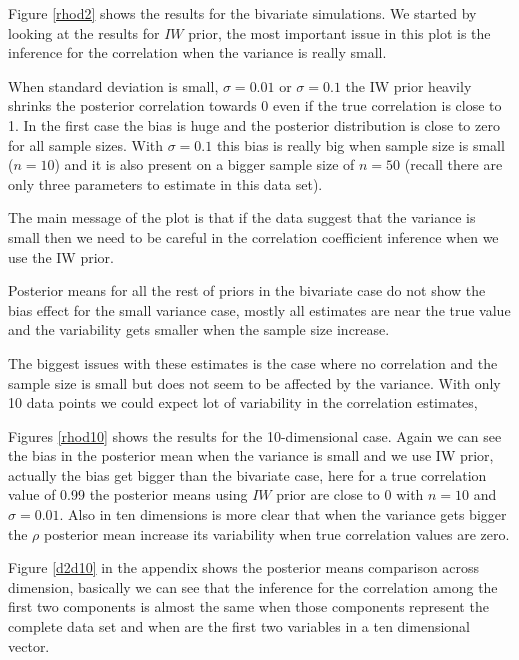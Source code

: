 \documentclass{article}
\begin{document}
Figure \ref{rhod2} shows the results for the bivariate simulations.  We started by looking at the results for $IW$ prior, the most important issue in this plot is the inference for the correlation when the variance is really small. 

When standard deviation is small, $\sigma=0.01$ or $\sigma=0.1$ the IW prior heavily shrinks the posterior correlation towards 0 even if the true correlation is close to 1. In the first case the bias is huge and the posterior distribution is close to zero for all sample sizes.  With $\sigma=0.1$ this bias is really big when sample size is small ($n=10$) and it is also present on a bigger sample size of $n=50$ (recall there are only three parameters to estimate in this data set). 

The main message of the plot is that if the data suggest that the variance is small then we need to be careful in the correlation coefficient inference when we use the IW prior. 

Posterior means for all the rest of priors in the bivariate case  do not show the bias effect for the small variance case, mostly all estimates are near the true value and the variability gets smaller when the sample size increase.  

The biggest issues with these estimates is the case where no correlation and the sample size is small but does not seem to be affected by the variance.  With only 10 data points we could expect lot of variability in the correlation estimates,

Figures \ref{rhod10}  shows the results for the 10-dimensional case. Again we can see the bias in the posterior mean when the variance is small and we use IW prior, actually the bias get bigger than the bivariate case, here for a true correlation value of 0.99 the posterior means using $IW$ prior are close to 0 with  $n=10$ and $\sigma=0.01$. Also in ten dimensions is more clear that when the variance gets bigger the $\rho$ posterior mean increase its variability when true correlation values are zero.

Figure \ref{d2d10} in the appendix shows the posterior means comparison across dimension, basically we can see that the inference for the correlation among the first two components is almost the same when those components represent the complete data set and when are the first two variables  in a ten dimensional vector. 
\end{document}
